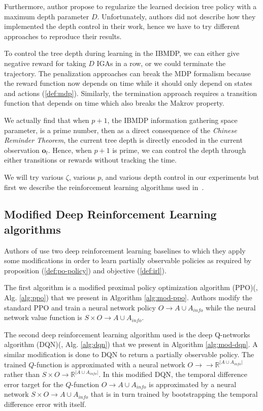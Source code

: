 Furthermore, author propose to regularize the learned decision tree policy with a maximum depth parameter $D$.
Unfortunately, authors did not describe how they implemented the depth control in their work, hence we have to try different approaches to reproduce their results.

To control the tree depth during learning in the IBMDP, we can either give negative reward for taking $D$ IGAs in a row, or we could terminate the trajectory. 
The penalization approaches can break the MDP formalism because the reward function now depends on time while it should only depend on states and actions (\ref{def:mdp}).
Similarly, the termination approach requires a transition function that depends on time which also breaks the Makrov property.

We actually find that when $p+1$, the IBMDP information gathering space parameter, is a prime number, then as a direct consequence of the \textit{Chinese Reminder Theorem}, the current tree depth is directly encoded in the current observation $\boldsymbol{o}_t$. 
Hence, when $p+1$ is prime, we can control the depth through either transitions or rewards without tracking the time.

We will try various $\zeta$, various $p$, and various depth control in our experiments but first we describe the reinforcement learning algorithms used in~\cite{topin2021iterative}.

\subsection{Modified Deep Reinforcement Learning algorithms}
Authors of \cite{topin2021iterative} use two deep reinforcement learning baselines to which they apply some modifications in order to learn partially observable policies as required by proposition (\ref{def:po-policy}) and objective (\ref{def:irl}).

The first algorithm is a modified proximal policy optimization algorithm (PPO)(\cite{ppo}, Alg. \ref{alg:ppo}) that we present in Algorithm \ref{alg:mod-ppo}.
Authors modify the standard PPO and train a neural network policy $O\rightarrow A\cup A_{info}$ while the neural network value function is $S\times O\rightarrow A\cup A_{info}$.

The second deep reinforcement learning algorithm used is the deep Q-networks algorithm (DQN)(\cite{dqn}, Alg. \ref{alg:dqn}) that we present in Algorithm \ref{alg:mod-dqn}.
A similar modification is done to DQN to return a partially observable policy. The trained $Q$-function is approximated with a neural network $O\rightarrow \rightarrow \mathbb{R}^{|A\cup A_{info}|}$ rather than $S\times O\rightarrow \mathbb{R}^{|A\cup A_{info}|}$.
In this modified DQN, the temporal difference error target for the $Q$-function $O\rightarrow A\cup A_{info}$ is approximated by a neural network $S\times O\rightarrow A\cup A_{info}$ that is in turn trained by bootstrapping the temporal difference error with itself.

